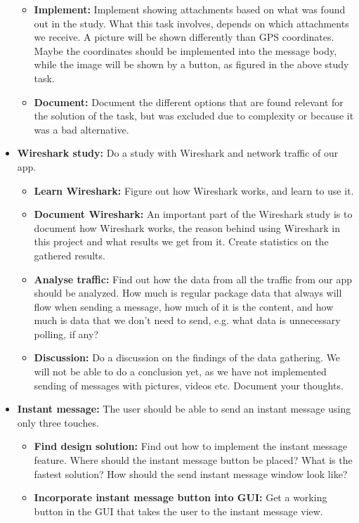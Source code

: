 \begin{itemize}
\begin{itemize}
\item{}\textbf{Implement:} Implement showing attachments based on what was found out in the study. What this task involves, depends on which attachments we receive. A picture will be shown differently than GPS coordinates. Maybe the coordinates should be implemented into the message body, while the image will be shown by a button, as figured in the above study task.
\item{}\textbf{Document:} Document the different options that are found relevant for the solution of the task, but was excluded due to complexity or because it was a bad alternative.
\end{itemize}
\item{}\textbf{Wireshark study:} Do a study with Wireshark and network traffic of our app.
\begin{itemize}
\item{}\textbf{Learn Wireshark:} Figure out how Wireshark works, and learn to use it.
\item{}\textbf{Document Wireshark:} An important part of the Wireshark study is to document how Wireshark works, the reason behind using Wireshark in this project and what results we get from it. Create statistics on the gathered results.
\item{}\textbf{Analyse traffic:} Find out how the data from all the traffic from our app should be analyzed. How much is regular package data that always will flow when sending a message, how much of it is the content, and how much is data that we don’t need to send, e.g. what data is unnecessary polling, if any?
\item{}\textbf{Discussion:} Do a discussion on the findings of the data gathering. We will not be able to do a conclusion yet, as we have not implemented sending of messages with pictures, videos etc. Document your thoughts.
\end{itemize}
\item{}\textbf{Instant message:} The user should be able to send an instant message using only three touches.
\begin{itemize}
\item{}\textbf{Find design solution:} Find out how to implement the instant message feature. Where should the instant message button be placed? What is the fastest solution? How should the send instant message window look like?
\item{}\textbf{Incorporate instant message button into GUI:} Get a working button in the GUI that takes the user to the instant message view.

\end{itemize}
\end{itemize}
